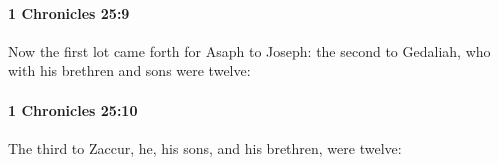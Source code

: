 		\paragraph{1 Chronicles 25:9} %
			\label{1CHRONICLES-25-9}

			Now the first lot came forth for Asaph to Joseph: the second to Gedaliah, who with his brethren and sons were twelve:


		\paragraph{1 Chronicles 25:10} %
			\label{1CHRONICLES-25-10}

			The third to Zaccur, he, his sons, and his brethren, were twelve:


